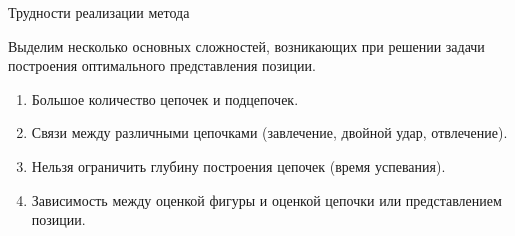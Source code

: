 \documentclass{beamer}
\begin{document}
\begin{frame}{Трудности реализации метода}

Выделим несколько основных сложностей, возникающих при решении задачи построения оптимального представления позиции.
\begin{enumerate}
\item Большое количество цепочек и подцепочек.
\item Связи между различными цепочками (завлечение, двойной удар, отвлечение).

\item Нельзя ограничить глубину построения цепочек (время успевания).

\item Зависимость между оценкой фигуры и оценкой цепочки или представлением позиции. 






\end{enumerate}
\end{frame}
\end{document}

